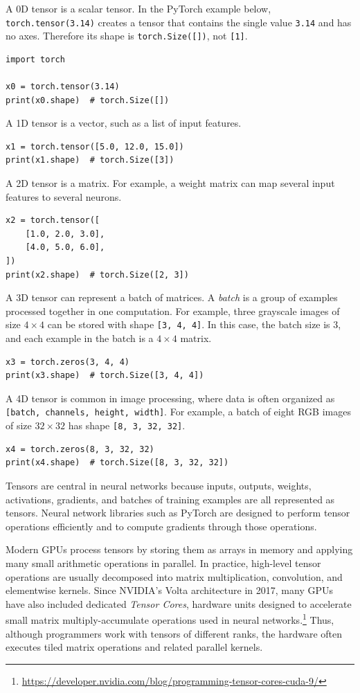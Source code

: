 \documentclass[11pt,openany,oneside]{book}
\begin{document}
A 0D tensor is a scalar tensor. In the PyTorch example below,
\texttt{torch.tensor(3.14)} creates a tensor that contains the single value
\texttt{3.14} and has no axes. Therefore its shape is \texttt{torch.Size([])},
not \texttt{[1]}.
\begin{verbatim}
import torch

x0 = torch.tensor(3.14)
print(x0.shape)  # torch.Size([])
\end{verbatim}

A 1D tensor is a vector, such as a list of input features.
\begin{verbatim}
x1 = torch.tensor([5.0, 12.0, 15.0])
print(x1.shape)  # torch.Size([3])
\end{verbatim}

A 2D tensor is a matrix. For example, a weight matrix can map several input
features to several neurons.
\begin{verbatim}
x2 = torch.tensor([
    [1.0, 2.0, 3.0],
    [4.0, 5.0, 6.0],
])
print(x2.shape)  # torch.Size([2, 3])
\end{verbatim}

A 3D tensor can represent a batch of matrices. A \emph{batch} is a group of
examples processed together in one computation. For example, three grayscale
images of size $4 \times 4$ can be stored with shape \texttt{[3, 4, 4]}. In this
case, the batch size is 3, and each example in the batch is a $4 \times 4$
matrix.
\begin{verbatim}
x3 = torch.zeros(3, 4, 4)
print(x3.shape)  # torch.Size([3, 4, 4])
\end{verbatim}

A 4D tensor is common in image processing, where data is often organized as
\texttt{[batch, channels, height, width]}. For example, a batch of eight RGB
images of size $32 \times 32$ has shape \texttt{[8, 3, 32, 32]}.
\begin{verbatim}
x4 = torch.zeros(8, 3, 32, 32)
print(x4.shape)  # torch.Size([8, 3, 32, 32])
\end{verbatim}

Tensors are central in neural networks because inputs, outputs, weights,
activations, gradients, and batches of training examples are all represented as
tensors. Neural network libraries such as PyTorch are designed to perform tensor
operations efficiently and to compute gradients through those operations.

Modern GPUs process tensors by storing them as arrays in memory and applying
many small arithmetic operations in parallel. In practice, high-level tensor
operations are usually decomposed into matrix multiplication, convolution, and
elementwise kernels. Since NVIDIA's Volta architecture in 2017, many GPUs have
also included dedicated \emph{Tensor Cores}, hardware units designed to
accelerate small matrix multiply-accumulate operations used in neural
networks.\footnote{\url{https://developer.nvidia.com/blog/programming-tensor-cores-cuda-9/}}
Thus, although programmers work with tensors of different ranks, the hardware
often executes tiled matrix operations and related parallel kernels.
\end{document}
